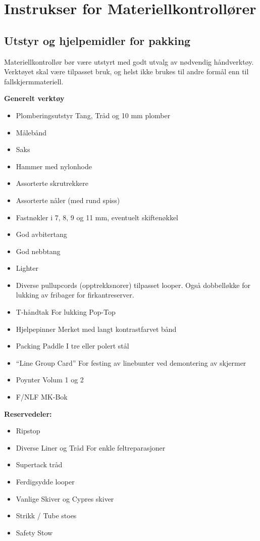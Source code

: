 \section{Instrukser for Materiellkontrollører}
\subsection{Utstyr og hjelpemidler for pakking}
Materiellkontrollør bør være utstyrt med godt utvalg av nødvendig håndverktøy. Verktøyet skal være tilpasset bruk, og helst ikke brukes til andre formål enn til fallskjermmateriell.

\textbf{Generelt verktøy}
\begin{itemize}
	\item Plomberingsutstyr
	Tang, Tråd og 10 mm plomber
	\item Målebånd
	\item Saks
	\item Hammer med nylonhode
	\item Assorterte skrutrekkere
	\item Assorterte nåler (med rund spiss)
	\item Fastnøkler i 7, 8, 9 og 11 mm, eventuelt skiftenøkkel
	\item God avbitertang
	\item God nebbtang
	\item Lighter
	\item Diverse pullupcords (opptrekksnorer) tilpasset looper.
	Også dobbelløkke for lukking av fribager for firkantreserver.
	\item T-håndtak
	For lukking Pop-Top
	\item Hjelpepinner
	Merket med langt kontrastfarvet bånd
	\item Packing Paddle
	I tre eller polert stål
	\item ``Line Group Card''
	For festing av linebunter ved demontering av skjermer
	\item Poynter Volum 1 og 2
	\item F/NLF MK-Bok
\end{itemize}

\textbf{Reservedeler:}
\begin{itemize}
	\item Ripstop
	\item Diverse Liner og Tråd
	For enkle feltreparasjoner
	\item Supertack tråd
	\item Ferdigsydde looper
	\item Vanlige Skiver og Cypres skiver
	\item Strikk / Tube stoes
	\item Safety Stow
\end{itemize}

